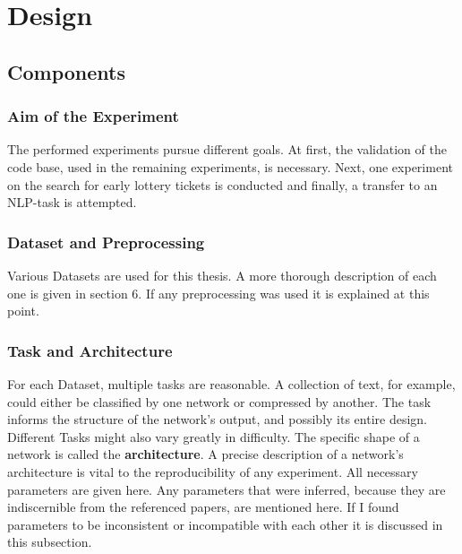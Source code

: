 \chapter{Design}
\label{ch:design}


\section{Components}
\subsection*{Aim of the Experiment}
The performed experiments pursue different goals. At first, the validation of the code base, used in the remaining experiments, is necessary. Next, one experiment on the search for early lottery tickets is conducted and finally, a transfer to an NLP-task is attempted.
\subsection*{Dataset and Preprocessing}
Various Datasets are used for this thesis. A more thorough description of each one is given in section 6. If any preprocessing was used it is explained at this point.
\subsection*{Task and Architecture}
For each Dataset, multiple tasks are reasonable. A collection of text, for example, could either be classified by one network or compressed by another. The task informs the structure of the network's output, and possibly its entire design. Different Tasks might also vary greatly in difficulty.
The specific shape of a network is called the \textbf{architecture}. A precise description of a network's architecture is vital to the reproducibility of any experiment. All necessary parameters are given here. Any parameters that were inferred,  because they are indiscernible from the referenced papers, are mentioned here. If I found parameters to be inconsistent or incompatible with each other it is discussed in this subsection.

